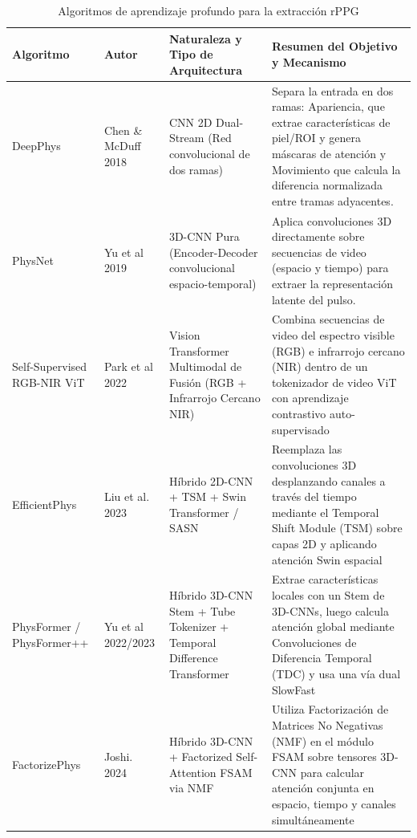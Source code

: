 \begin{longtable}{|p{2.5cm}|p{2.3cm}|p{3.2cm}|p{4.8cm}|}
    \caption{Algoritmos de aprendizaje profundo para la extracción rPPG}
    \label{tab:algoritmos_no_tradicionales_rppg} \\
        \hline
        \textbf{Algoritmo}              & \textbf{Autor}              & \textbf{Naturaleza y Tipo de Arquitectura}                              & \textbf{Resumen del Objetivo y Mecanismo} \\ \hline
        DeepPhys                        &  Chen \& McDuff 2018        & CNN 2D Dual-Stream (Red convolucional de dos ramas)                     &  Separa la entrada en dos ramas: Apariencia, que extrae características de piel/ROI y genera máscaras de atención y Movimiento que calcula la diferencia normalizada entre tramas adyacentes. \cite{yang2022image_en, yu2023physformer}  \\ \hline
        PhysNet                         &  Yu et al 2019              & 3D-CNN Pura (Encoder-Decoder convolucional espacio-temporal)            &  Aplica convoluciones 3D directamente sobre secuencias de video (espacio y tiempo) para extraer la representación latente del pulso. \cite{yang2022image_en}  \\ \hline
        Self-Supervised RGB-NIR ViT     &  Park et al 2022            & Vision Transformer Multimodal de Fusión (RGB + Infrarrojo Cercano NIR)  &  Combina secuencias de video del espectro visible (RGB) e infrarrojo cercano (NIR) dentro de un tokenizador de video ViT con aprendizaje contrastivo auto-supervisado \cite{yu2024rgbnir}  \\ \hline
        EfficientPhys                   &  Liu et al. 2023            & Híbrido 2D-CNN + TSM + Swin Transformer / SASN                          &  Reemplaza las convoluciones 3D desplanzando canales a través del tiempo mediante el Temporal Shift Module (TSM) sobre capas 2D y aplicando atención Swin espacial \cite{dehnad2024factorize}  \\ \hline
        PhysFormer / PhysFormer++       &  Yu et al 2022/2023         & Híbrido 3D-CNN Stem + Tube Tokenizer + Temporal Difference Transformer  &  Extrae características locales con un Stem de 3D-CNNs, luego calcula atención global mediante Convoluciones de Diferencia Temporal (TDC) y usa una vía dual SlowFast \cite{yu2023physformer}  \\ \hline
        FactorizePhys                   &  Joshi. 2024                & Híbrido 3D-CNN + Factorized Self-Attention FSAM via NMF                 &  Utiliza Factorización de Matrices No Negativas (NMF) en el módulo FSAM sobre tensores 3D-CNN para calcular atención conjunta en espacio, tiempo y canales simultáneamente \cite{dehnad2024factorize}  \\ \hline

\end{longtable}
